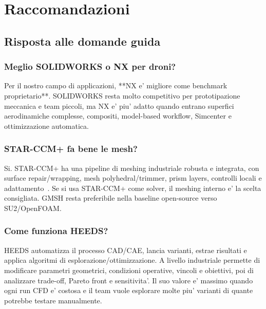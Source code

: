 
\chapter{Raccomandazioni}
\label{cap:recommendations}

\section{Risposta alle domande guida}

\subsection{Meglio SOLIDWORKS o NX per droni?}

Per il nostro campo di applicazioni, **NX e' migliore come benchmark proprietario**. SOLIDWORKS resta molto competitivo per prototipazione meccanica e team piccoli, ma NX e' piu' adatto quando entrano superfici aerodinamiche complesse, compositi, model-based workflow, Simcenter e ottimizzazione automatica.

\subsection{STAR-CCM+ fa bene le mesh?}

Si. STAR-CCM+ ha una pipeline di meshing industriale robusta e integrata, con surface repair/wrapping, mesh polyhedral/trimmer, prism layers, controlli locali e adattamento~\cite{starccm_official,starccm_training}. Se si usa STAR-CCM+ come solver, il meshing interno e' la scelta consigliata. GMSH resta preferibile nella baseline open-source verso SU2/OpenFOAM.

\subsection{Come funziona HEEDS?}

HEEDS automatizza il processo CAD/CAE, lancia varianti, estrae risultati e applica algoritmi di esplorazione/ottimizzazione. A livello industriale permette di modificare parametri geometrici, condizioni operative, vincoli e obiettivi, poi di analizzare trade-off, Pareto front e sensitivita'. Il suo valore e' massimo quando ogni run CFD e' costosa e il team vuole esplorare molte piu' varianti di quante potrebbe testare manualmente.


